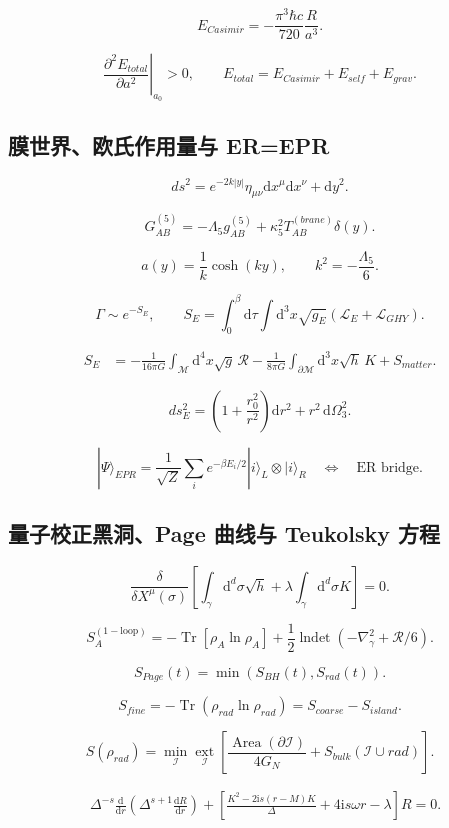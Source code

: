 \documentclass[UTF8,11pt,a4paper]{ctexart}
\newcommand{\R}{\mathcal{R}}
\newcommand{\I}{\mathcal{I}}
\newcommand{\M}{\mathcal{M}}
\newcommand{\Lag}{\mathcal{L}}
\newcommand{\Tr}{\operatorname{Tr}}
\newcommand{\Area}{\operatorname{Area}}
\newcommand{\lndet}{\operatorname{lndet}}
\newcommand{\ext}{\operatorname*{ext}}
\newcommand{\dd}{\mathrm{d}}
\newcommand{\ii}{\mathrm{i}}
\begin{document}
\[
E_{Casimir}=-\frac{\pi^3\hbar c}{720}\frac{R}{a^3}.
\]

\[
\left.\frac{\partial^2E_{total}}{\partial a^2}\right|_{a_0}>0,
\qquad
E_{total}=E_{Casimir}+E_{self}+E_{grav}.
\]

\subsection{膜世界、欧氏作用量与 ER=EPR}

\[
ds^2=e^{-2k|y|}\eta_{\mu\nu}\dd x^\mu\dd x^\nu+\dd y^2.
\]

\[
G_{AB}^{(5)}=-\Lambda_5g_{AB}^{(5)}
+\kappa_5^2T_{AB}^{(brane)}\delta(y).
\]

\[
a(y)=\frac1k\cosh(ky),\qquad
k^2=-\frac{\Lambda_5}{6}.
\]

\[
\Gamma\sim e^{-S_E},\qquad
S_E=\int_0^\beta\dd\tau\int\dd^3x\sqrt{g_E}
\left(\Lag_E+\Lag_{GHY}\right).
\]

\begin{align*}
S_E
&=-\frac{1}{16\pi G}\int_{\M}\dd^4x\sqrt{g}\,\R
-\frac{1}{8\pi G}\int_{\partial\M}\dd^3x\sqrt{h}\,K
+S_{matter}.
\end{align*}

\[
ds_E^2=\left(1+\frac{r_0^2}{r^2}\right)\dd r^2
+r^2\,\dd\Omega_3^2.
\]

\[
|\Psi\rangle_{EPR}
=\frac{1}{\sqrt{Z}}\sum_i e^{-\beta E_i/2}|i\rangle_L\otimes|i\rangle_R
\quad\Longleftrightarrow\quad \text{ER bridge}.
\]

\subsection{量子校正黑洞、Page 曲线与 Teukolsky 方程}

\[
\frac{\delta}{\delta X^\mu(\sigma)}
\left[\int_\gamma\dd^d\sigma\sqrt{h}
+\lambda\int_\gamma\dd^d\sigma K\right]=0.
\]

\[
S_A^{(1-\mathrm{loop})}
=-\Tr\left[\rho_A\ln\rho_A\right]
+\frac12\lndet\left(-\nabla_\gamma^2+\R/6\right).
\]

\[
S_{Page}(t)=\min\left(S_{BH}(t),S_{rad}(t)\right).
\]

\[
S_{fine}=-\Tr\left(\rho_{rad}\ln\rho_{rad}\right)
=S_{coarse}-S_{island}.
\]

\[
S(\rho_{rad})
=\min_{\I}\ext_{\I}
\left[\frac{\Area(\partial\I)}{4G_N}
+S_{bulk}(\I\cup rad)\right].
\]

\begin{align*}
&\Delta^{-s}\frac{\dd}{\dd r}
\left(\Delta^{s+1}\frac{\dd R}{\dd r}\right)
+\left[\frac{K^2-2\ii s(r-M)K}{\Delta}
+4\ii s\omega r-\lambda\right]R=0.
\end{align*}
\end{document}
